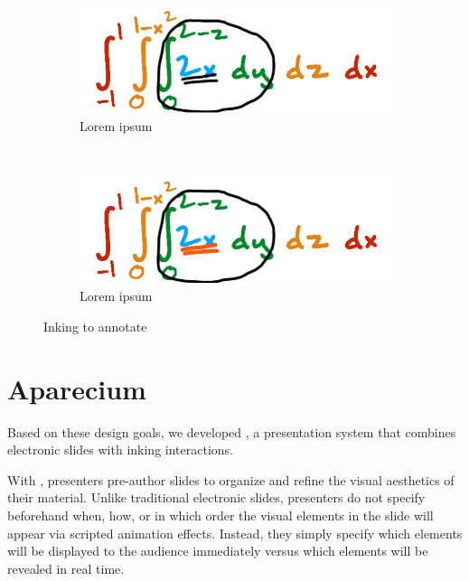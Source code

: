 \begin{figure}[t!]
    \centering
    \begin{subfigure}[t]{0.5\columnwidth}
        \centering
        \includegraphics[width=1\columnwidth]{figures/annotate_presenter}
        \caption{Lorem ipsum}
    \end{subfigure}%
    ~ 
    \begin{subfigure}[t]{0.5\columnwidth}
        \centering
        \includegraphics[width=1\columnwidth]{figures/annotate_audience}
        \caption{Lorem ipsum}
    \end{subfigure}
      
    \caption{Inking to annotate}
\end{figure}

\section{Aparecium}

Based on these design goals, we developed \interface, a presentation system that combines electronic slides with inking interactions. 

With \interface, presenters pre-author slides to organize and refine the visual aesthetics of their material.
%
Unlike traditional electronic slides, presenters do not specify beforehand when, how, or in which order the visual elements in the slide will appear via scripted animation effects. Instead, they simply specify which elements will be displayed to the audience immediately versus which elements will be revealed in real time. 

